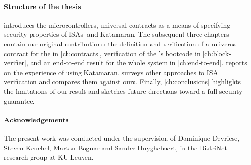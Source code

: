 \paragraph{Structure of the thesis}
 introduces the \msp microcontrollers, universal contracts as a means of specifying security properties of ISAs, and Katamaran. The subsequent three chapters contain our original contributions: the definition and verification of a universal contract for the \msp in \cref{ch:contracts}, verification of the \msp's bootcode in \cref{ch:block-verifier}, and an end-to-end result for the whole system in \cref{ch:end-to-end}.  reports on the experience of using Katamaran.  surveys other approaches to ISA verification and compares them against ours. Finally, \cref{ch:conclusions} highlights the limitations of our result and sketches future directions toward a full security guarantee.

\paragraph{Acknowledgements}
The present work was conducted under the supervision of \prof Dominique Devriese, \dr Steven Keuchel, \dr Marton Bognar and Sander Huyghebaert, in the DistriNet research group at KU Leuven.
